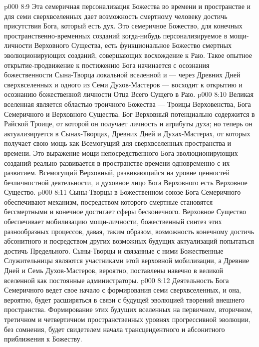 \vs p000 8:9 \pc Эта семеричная персонализация Божества во времени и пространстве и для семи сверхвселенных дает возможность смертному человеку достичь присутствия Бога, который есть дух. Это семеричное Божество, для конечных пространственно\hyp{}временных созданий когда\hyp{}нибудь персонализируемое в мощи\hyp{}личности Верховного Существа, есть функциональное Божество смертных эволюционирующих созданий, совершающих восхождение к Раю. Такое опытное открытие\hyp{}продвижение к постижению Бога начинается с осознания божественности Сына\hyp{}Творца локальной вселенной и --- через Древних Дней сверхвселенных и одного из Семи Духов\hyp{}Мастеров --- восходит к открытию и осознанию божественной личности Отца Всего Сущего в Раю.
\vs p000 8:10 \pc Великая вселенная является областью троичного Божества --- Троицы Верховенства, Бога Семеричного и Верховного Существа. Бог Верховный потенциально содержится в Райской Троице, от которой он получает личность и атрибуты духа; но теперь он актуализируется в Сынах\hyp{}Творцах, Древних Дней и Духах\hyp{}Мастерах, от которых получает свою мощь как Всемогущий для сверхвселенных пространства и времени. Это выражение мощи непосредственного Бога эволюционирующих созданий реально развивается в пространстве\hyp{}времени одновременно с их развитием. Всемогущий Верховный, развивающийся на уровне ценностей безличностной деятельности, и духовное лицо Бога Верховного есть  Верховное Существо.
\vs p000 8:11 Сыны\hyp{}Творцы в Божественном союзе Бога Семеричного обеспечивают механизм, посредством которого смертные становятся бессмертными и конечное достигает сферы бесконечного. Верховное Существо обеспечивает мобилизацию мощи\hyp{}личности, божественный синтез  этих разнообразных процессов, давая, таким образом, возможность конечному достичь абсонитного и посредством других возможных будущих актуализаций попытаться достичь Предельного. Сыны\hyp{}Творцы и связанные с ними Божественные Служительницы являются участниками этой верховной мобилизации, а Древние Дней и Семь Духов\hyp{}Мастеров, вероятно, поставлены навечно в великой вселенной как постоянные администраторы.
\vs p000 8:12 Деятельность Бога Семеричного ведет свое начало с формирования семи сверхвселенных, и она, вероятно, будет расширяться в связи с будущей эволюцией творений внешнего пространства. Формирование этих будущих вселенных на первичном, вторичном, третичном и четвертичном пространственных уровнях прогрессивной эволюции, без сомнения, будет свидетелем начала трансцендентного и абсонитного приближения к Божеству.

